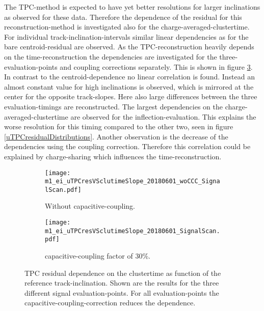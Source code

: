 \documentclass[
twoside,            %
BCOR1.4cm,          %
10pt,               %
headings=normal,    %
headsepline,        %
clearplainpage,		%
final,              %
div=14,
open=right,
bibliography=toc
]{scrreprt}
\begin{document}
The \textmu TPC-method is expected to have yet better resolutions for larger inclinations as observed for these data.
Therefore the dependence of the residual for this reconstruction-method is investigated also for the charge-averaged-clustertime.
For individual track-inclination-intervals similar linear dependencies as for the bare centroid-residual are observed.
As the \textmu TPC-reconstruction heavily depends on the time-reconstruction the dependencies are investigated for the three-evaluation-points and coupling corrections separately.
This is shown in figure \ref{uTPCclustertimeDependence}.
In contrast to the centroid-dependence no linear correlation is found.
Instead an almost constant value for high inclinations is observed, which is mirrored at the center for the opposite track-slopes.
Here also large differences between the three evaluation-timings are reconstructed.
The largest dependencies on the charge-averaged-clustertime are observed for the inflection-evaluation.
This explains the worse resolution for this timing compared to the other two, seen in figure \ref{uTPCresidualDistributions}.
Another observation is the decrease of the dependencies using the coupling correction.
Therefore this correlation could be explained by charge-sharing which influences the time-reconstruction.

\begin{figure}[!h]
	\begin{subfigure}[b]{0.48\textwidth}
		\centering
		\texttt{[image: m1\_ei\_uTPCresVSclutimeSlope\_20180601\_woCCC\_SignalScan.pdf]}
		\caption{
			Without capacitive-coupling. 
		}
		\label{uTPCresVSclutimeSlope_signalScan_woCCC} 
	\end{subfigure}
	\hfill
	\begin{subfigure}[b]{0.48\textwidth}
		\centering
		\texttt{[image: m1\_ei\_uTPCresVSclutimeSlope\_20180601\_SignalScan.pdf]}
		\caption{
			capacitive-coupling factor of 30\%.
		}
		\label{uTPCresVSclutimeSlope_signalScan_CCC30} 
	\end{subfigure}
	\vspace{-2mm}
	\caption{
		\textmu TPC residual dependence on the clustertime as function of the reference track-inclination.
		Shown are the results for the three different signal evaluation-points.
		For all evaluation-points the capacitive-coupling-correction reduces the dependence.
	}
	\label{uTPCclustertimeDependence}
	\vspace{-2mm}
\end{figure}
\end{document}
